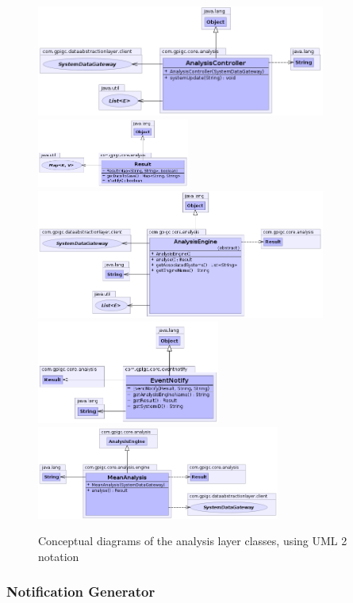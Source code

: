 \documentclass[10pt,a4paper]{article}
\begin{document}
\begin{figure}[ht!]
\centering
\includegraphics[width= 9.5cm]{images/Analysis/AnalysisController.png}
\includegraphics[width= 5cm]{images/Analysis/Result.png}
\includegraphics[width= 9.5cm]{images/Analysis/AnalysisEngine.png}
\includegraphics[width= 6cm]{images/Analysis/EventNotify.png}
\includegraphics[width= 8cm]{images/Analysis/MeanAnalysis.png}
\caption{Conceptual diagrams of the analysis layer classes, using UML 2 notation}
\label{fig:dataAbstractionPackage}
\end{figure}

\subsubsection{Notification Generator}
\end{document}
